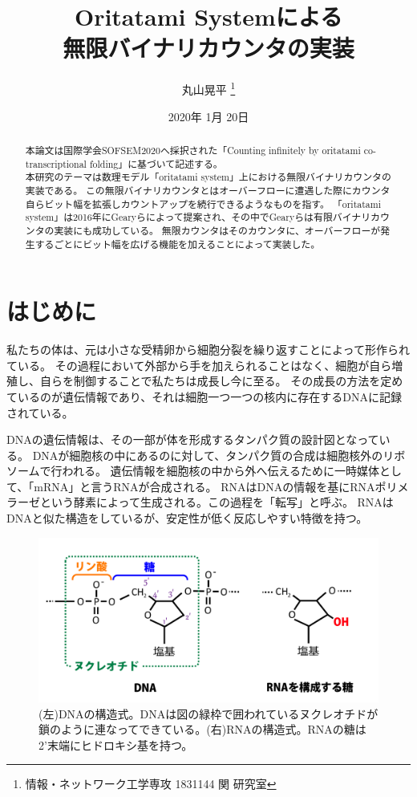 \documentclass[a4,11pt]{article}
\title{Oritatami Systemによる\\無限バイナリカウンタの実装}
\author{丸山晃平
\thanks{情報・ネットワーク工学専攻 1831144 関 研究室}
}
\date{2020年 1月 20日}%
\begin{document}
\maketitle

\thispagestyle{empty}
\newpage
\tableofcontents
\newpage

\begin{abstract}
本論文は国際学会SOFSEM2020へ採択された「Counting infinitely by oritatami co-transcriptional folding」に基づいて記述する。\\
本研究のテーマは数理モデル「oritatami system」上における無限バイナリカウンタの実装である。
この無限バイナリカウンタとはオーバーフローに遭遇した際にカウンタ自らビット幅を拡張しカウントアップを続行できるようなものを指す。
「oritatami system」は2016年にGearyらによって提案され、その中でGearyらは有限バイナリカウンタの実装にも成功している。
無限カウンタはそのカウンタに、オーバーフローが発生するごとにビット幅を広げる機能を加えることによって実装した。
\end{abstract}

\section{はじめに}
%

私たちの体は、元は小さな受精卵から細胞分裂を繰り返すことによって形作られている。
その過程において外部から手を加えられることはなく、細胞が自ら増殖し、自らを制御することで私たちは成長し今に至る。
その成長の方法を定めているのが遺伝情報であり、それは細胞一つ一つの核内に存在するDNAに記録されている。

DNAの遺伝情報は、その一部が体を形成するタンパク質の設計図となっている。
DNAが細胞核の中にあるのに対して、タンパク質の合成は細胞核外のリボソームで行われる。
遺伝情報を細胞核の中から外へ伝えるために一時媒体として、「mRNA」と言うRNAが合成される。
RNAはDNAの情報を基にRNAポリメラーゼという酵素によって生成される。この過程を「転写」と呼ぶ。
RNAはDNAと似た構造をしているが、安定性が低く反応しやすい特徴を持つ。

\begin{figure}[h]
  \centering
  \includegraphics[width=\textwidth]{fig/dnarna.png}
  \caption{(左)DNAの構造式。DNAは図の緑枠で囲われているヌクレオチドが鎖のように連なってできている。(右)RNAの構造式。RNAの糖は2'末端にヒドロキシ基を持つ。}
  \label{dnarna}
\end{figure}
\end{document}
